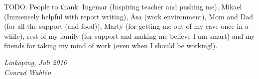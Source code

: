 \begin{acknowledgments}
  TODO: People to thank: Ingemar (Inspiring teacher and pushing me), Mikael (Immensely helpful with report writing), Åsa (work environment), Mom and Dad (for all the support (and food)), Marty (for getting me out of my cave once in a while), rest of my family (for support and making me believe I am smart) and my friends for taking my mind of work (even when I should be working!). 

  \addvspace{1em}
  \begin{flushright}
    \textit{%
      Linköping, Juli 2016\\
      Conrad Wahlén
    }
  \end{flushright}
\end{acknowledgments}
